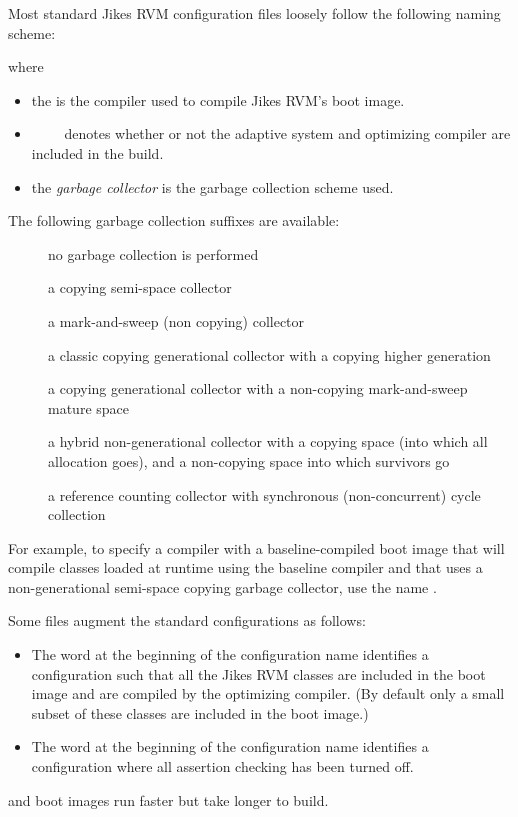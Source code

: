 Most standard Jikes RVM configuration files loosely follow the
following naming scheme:
\begin{verse}
       \Mlbr{}  \Mor{}  \Mrbr{}
\end{verse}

%
%
where
\begin{itemize}
\item the  is the compiler used to compile
Jikes RVM's boot image. 
\item
 \Mlbr{}~~\Mor~~\Mrbr{} denotes whether or
 not the adaptive system and optimizing compiler are included in the
 build.  
\item the {\em garbage collector} is the garbage collection scheme used.
\end{itemize}

The following garbage collection suffixes are available:

\begin{description}
\item[] no garbage collection is performed
\item[] a copying semi-space collector
\item[] a mark-and-sweep (non copying) collector
\item[] a classic copying generational collector with a copying
  higher generation
\item[] a copying generational collector with a non-copying
  mark-and-sweep mature space
\item[] a hybrid non-generational collector with a copying space
  (into which all allocation goes), and a non-copying space into which
  survivors go
\item[] a reference counting collector with synchronous
  (non-concurrent) cycle collection
\end{description}

For example, to specify a compiler with a baseline-compiled boot image
that will compile classes loaded at runtime using the baseline 
compiler and that uses a non-generational semi-space copying garbage
collector, use the name .

Some files augment the standard configurations as follows:
\begin{itemize}
\item The word 
 at the beginning of the configuration name identifies a
configuration such that all the Jikes RVM classes are included in the
boot image and are compiled by the optimizing compiler.  (By default
only a small subset of these classes are included in the boot image.)
\item The word  at the beginning of the configuration name identifies a
 configuration where all assertion checking has been turned off.
\end{itemize}
 and  boot images run faster but take
longer to build.


